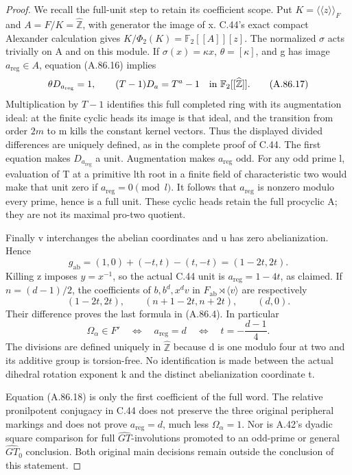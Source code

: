 \begin{proof}
We recall the full-unit step to retain its coefficient scope.
Put \(K=\langle\!\langle z\rangle\!\rangle_F\) and
\(A=F/K=\widehat{\mathbb Z}\), with generator the image of x.
C.44's exact compact Alexander calculation gives
\(K/\Phi_2(K)=\mathbb F_2[[A]][z]\). The normalized
\(\sigma\) acts trivially on A and on this module. If
\(\sigma(x)=\kappa x\), \(\theta=[\kappa]\), and
g has image \(a_{\mathrm{reg}}\in A\), equation (A.86.16)
implies
\[
 \theta D_{a_{\mathrm{reg}}}=1,
 \qquad (T-1)D_a=T^a-1
       \quad\hbox{in }\mathbb F_2[[\widehat{\mathbb Z}]].
 \tag{A.86.17}
\]
Multiplication by \(T-1\) identifies this full completed ring
with its augmentation ideal: at the finite cyclic heads its image
is that ideal, and the transition from order \(2m\) to m kills
the constant kernel vectors. Thus the displayed divided differences
are uniquely defined, as in the complete proof of C.44. The first
equation makes \(D_{a_{\mathrm{reg}}}\) a unit. Augmentation
makes \(a_{\mathrm{reg}}\) odd. For any odd prime l, evaluation
of T at a primitive lth root in a finite field of characteristic two
would make that unit zero if \(a_{\mathrm{reg}}=0\pmod l\).
It follows that \(a_{\mathrm{reg}}\) is nonzero modulo every
prime, hence is a full unit. These cyclic heads retain the full
procyclic A; they are not its maximal pro-two quotient.

Finally v interchanges the abelian coordinates and u has zero
abelianization. Hence
\[
 g_{\mathrm{ab}}=(1,0)+(-t,t)-(t,-t)=(1-2t,2t).
\]
Killing z imposes \(y=x^{-1}\), so the actual C.44 unit is
\(a_{\mathrm{reg}}=1-4t\), as claimed. If \(n=(d-1)/2\),
the coefficients of \(b,b^d,x^dv\) in
\(F_{\mathrm{ab}}\rtimes\langle v\rangle\) are respectively
\[
 (1-2t,2t),\qquad(n+1-2t,n+2t),\qquad(d,0).
\]
Their difference proves the last formula in (A.86.4). In particular
\[
       \Omega_\alpha\in F'
       \quad\Longleftrightarrow\quad
       a_{\mathrm{reg}}=d
       \quad\Longleftrightarrow\quad
       t=-\frac{d-1}{4}.
 \tag{A.86.18}
\]
The divisions are defined uniquely in \(\widehat{\mathbb Z}\)
because d is one modulo four at two and its additive group is
torsion-free. No identification is made between the actual dihedral
rotation exponent k and the distinct abelianization coordinate t.

Equation (A.86.18) is only the first coefficient of the full word.
The relative pronilpotent conjugacy in C.44 does not preserve the
three original peripheral markings and does not prove
\(a_{\mathrm{reg}}=d\), much less \(\Omega_\alpha=1\).
Nor is A.42's dyadic square comparison for full
\(\widehat{GT}\)-involutions promoted to an odd-prime or general
\(\widehat{GT}_0\) conclusion. Both original main decisions
remain outside the conclusion of this statement.
\end{proof}
